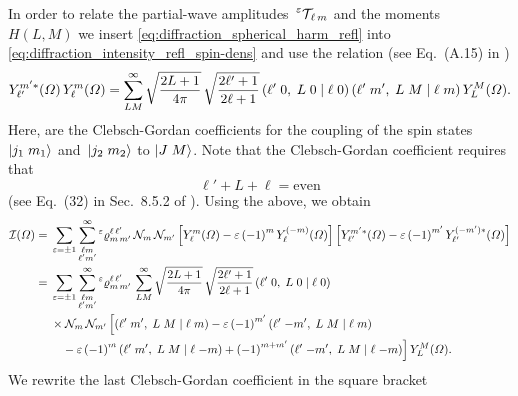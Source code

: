 In order to relate the partial-wave
amplitudes~$\prescript{\ensuremath{\varepsilon}}{}{\mathcal{T\!}}_{\ell\, m}$ and the
moments~$H(L, M)$ we insert \cref{eq:diffraction_spherical_harm_refl}
into \cref{eq:diffraction_intensity_refl_spin-dens} and use the
relation (see Eq.~(A.15) in )
\begin{equation}
  Y_{\ell'}^{m' *}(\Omega)\, Y_{\ell}^m(\Omega)
  = \sum_{L M}^\infty \sqrt{\frac{2 L + 1}{4 \pi}}\, \sqrt{\frac{2 \ell' + 1}{2 \ell + 1}}\, ({\ell'}\;{0},\;{L}\;{0}\; |\; {\ell}\;{0})\, ({\ell'}\;{m'},\;{L}\;{M}\; |\; {\ell}\;{m})\, Y_L^M(\Omega).
\end{equation}
Here,  are the Clebsch-Gordan
coefficients for the coupling of the spin states $\ket{j_1\; m_1}$
and~$\ket{j_2\; m_2}$ to $\ket{J\; M}$.  Note that the Clebsch-Gordan
coefficient  requires that
\begin{equation}
  \label{eq:ang_mom_sum}
  \ell' + L + \ell
  = \text{even}
\end{equation}
(see Eq.~(32) in Sec.~8.5.2 of ).  Using
the above, we obtain
\begin{align}
  \mathcal{I}(\Omega)
  ={}&
    \sum_{\refl = \pm 1} \sum_{\substack{\ell m \\ \ell' m'}}^\infty
    \prescript{\refl}{}{\varrho}^{\ell\, \ell'}_{m\, m'}\,
    \mathcal{N}_m\, \mathcal{N}_{m'}
    \sBrk[2]{Y_\ell^m(\Omega) - \refl\, {(-1)}^m\, Y_\ell^{(-m)}(\Omega)}
    \sBrk[2]{Y_{\ell'}^{m' *}(\Omega) - \refl\, {(-1)}^{m'}\, Y_{\ell'}^{(-m') *}(\Omega)}
  \\
  ={}& \begin{multlined}[t][0.85\columnwidth]
    \sum_{\refl = \pm 1} \sum_{\substack{\ell m \\ \ell' m'}}^\infty
    \prescript{\refl}{}{\varrho}^{\ell\, \ell'}_{m\, m'}\,
    \sum_{L M}^\infty \sqrt{\frac{2 L + 1}{4 \pi}}\, \sqrt{\frac{2 \ell' + 1}{2 \ell + 1}}\, \clebsch{\ell'}{0}{L}{0}{\ell}{0} \\
    \shoveleft{\times \mathcal{N}_m\, \mathcal{N}_{m'}\, \Big[ \clebsch{\ell'}{m'}{L}{M}{\ell}{m}                       - \refl\, {(-1)}^{m'}\, \clebsch{\ell'}{-m'}{L}{M}{\ell}{m}} \\
      - \refl\, {(-1)}^m\, \clebsch{\ell'}{m'}{L}{M}{\ell}{-m} + {(-1)}^{m + m'}\, \clebsch{\ell'}{-m'}{L}{M}{\ell}{-m} \Big]\,
    Y_L^M(\Omega).
  \end{multlined}
\end{align}
We rewrite the last Clebsch-Gordan coefficient in the square bracket

